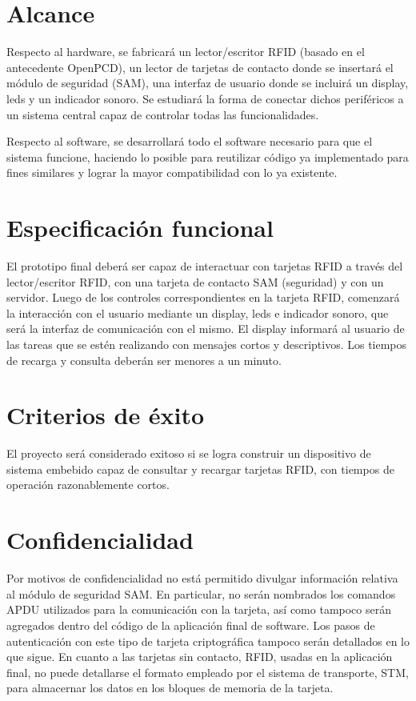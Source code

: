 \section{Alcance}

Respecto al hardware, se fabricará un lector/escritor RFID (basado en el antecedente OpenPCD), un lector de tarjetas de contacto donde se insertará el módulo de seguridad (SAM), una interfaz de usuario donde se incluirá un display, leds y  un indicador sonoro. Se estudiará la forma de conectar dichos periféricos a un sistema central capaz de controlar todas las funcionalidades.

\bigskip
Respecto al software, se desarrollará todo el software necesario para que el sistema funcione, haciendo lo posible para reutilizar código ya implementado para fines similares y lograr la mayor compatibilidad con lo ya existente.


\section{Especificación funcional}

El prototipo final deberá ser capaz de interactuar con tarjetas RFID a través del \\
lector/escritor RFID, con una tarjeta de contacto SAM (seguridad) y con un servidor. Luego de los controles correspondientes en la tarjeta RFID, comenzará la interacción con el usuario mediante un display, leds e indicador sonoro, que será la interfaz de comunicación con el mismo. El display informará al usuario de las tareas que se estén realizando con mensajes cortos y descriptivos. Los tiempos de recarga y consulta deberán ser menores a un minuto.


\section{Criterios de éxito}

El proyecto será considerado exitoso si se logra construir un dispositivo de sistema embebido capaz de consultar y recargar tarjetas RFID, con tiempos de operación razonablemente cortos.

\section{Confidencialidad}

Por motivos de confidencialidad no está permitido divulgar información relativa al módulo de seguridad SAM. 
En particular, no serán nombrados los comandos APDU utilizados para la comunicación con la tarjeta, así como 
tampoco serán agregados dentro del código de la aplicación final de software. Los pasos de autenticación
con este tipo de tarjeta criptográfica tampoco serán detallados en lo que sigue.
En cuanto a las tarjetas sin contacto, RFID, usadas en la aplicación final, no puede detallarse el formato
empleado por el sistema de transporte, STM, para almacernar los datos en los bloques de memoria de la tarjeta.
